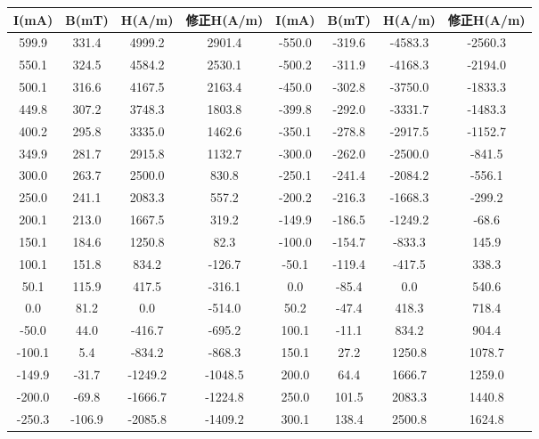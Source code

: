 \documentclass[11pt]{article}
\begin{document}
\begin{table}[H]
    \centering
    \begin{tabular}{|c|c|c|c|c|c|c|c|}\hline
    I(mA) & B(mT) & H(A/m) & 修正H(A/m) & I(mA) & B(mT) & H(A/m) & 修正H(A/m) \\ \hline
    599.9  & 331.4  & 4999.2  & 2901.4  & -550.0  & -319.6  & -4583.3  & -2560.3  \\ \hline
    550.1  & 324.5  & 4584.2  & 2530.1  & -500.2  & -311.9  & -4168.3  & -2194.0  \\ \hline
    500.1  & 316.6  & 4167.5  & 2163.4  & -450.0  & -302.8  & -3750.0  & -1833.3  \\ \hline
    449.8  & 307.2  & 3748.3  & 1803.8  & -399.8  & -292.0  & -3331.7  & -1483.3  \\ \hline
    400.2  & 295.8  & 3335.0  & 1462.6  & -350.1  & -278.8  & -2917.5  & -1152.7  \\ \hline
    349.9  & 281.7  & 2915.8  & 1132.7  & -300.0  & -262.0  & -2500.0  & -841.5  \\ \hline
    300.0  & 263.7  & 2500.0  & 830.8  & -250.1  & -241.4  & -2084.2  & -556.1  \\ \hline
    250.0  & 241.1  & 2083.3  & 557.2  & -200.2  & -216.3  & -1668.3  & -299.2  \\ \hline
    200.1  & 213.0  & 1667.5  & 319.2  & -149.9  & -186.5  & -1249.2  & -68.6  \\ \hline
    150.1  & 184.6  & 1250.8  & 82.3  & -100.0  & -154.7  & -833.3  & 145.9  \\ \hline
    100.1  & 151.8  & 834.2  & -126.7  & -50.1  & -119.4  & -417.5  & 338.3  \\ \hline
    50.1  & 115.9  & 417.5  & -316.1  & 0.0   & -85.4  & 0.0   & 540.6  \\ \hline
    0.0   & 81.2  & 0.0   & -514.0  & 50.2  & -47.4  & 418.3  & 718.4  \\ \hline
    -50.0  & 44.0  & -416.7  & -695.2  & 100.1  & -11.1  & 834.2  & 904.4  \\ \hline
    -100.1  & 5.4   & -834.2  & -868.3  & 150.1  & 27.2  & 1250.8  & 1078.7  \\ \hline
    -149.9  & -31.7  & -1249.2  & -1048.5  & 200.0  & 64.4  & 1666.7  & 1259.0  \\ \hline
    -200.0  & -69.8  & -1666.7  & -1224.8  & 250.0  & 101.5  & 2083.3  & 1440.8  \\ \hline
    -250.3  & -106.9  & -2085.8  & -1409.2  & 300.1  & 138.4  & 2500.8  & 1624.8  \\ \hline

\end{tabular}
\end{table}
\end{document}
